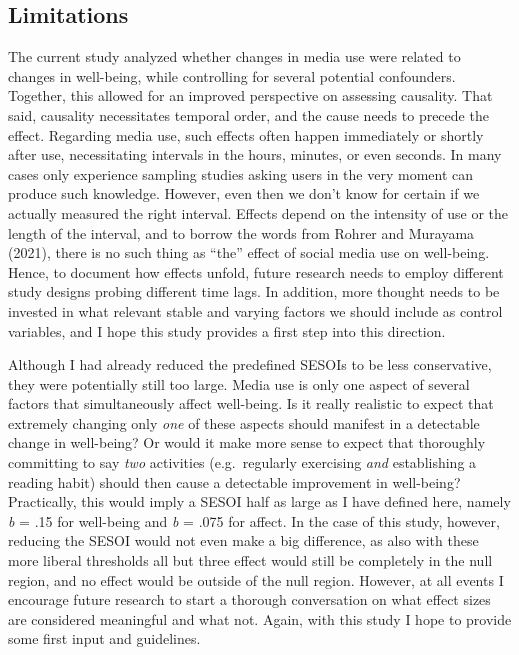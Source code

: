 \documentclass[
  man,mask]{apa6}
\begin{document}
\hypertarget{limitations}{%
\subsection{Limitations}\label{limitations}}

The current study analyzed whether changes in media use were related to changes in well-being, while controlling for several potential confounders.
Together, this allowed for an improved perspective on assessing causality.
That said, causality necessitates temporal order, and the cause needs to precede the effect.
Regarding media use, such effects often happen immediately or shortly after use, necessitating intervals in the hours, minutes, or even seconds.
In many cases only experience sampling studies asking users in the very moment can produce such knowledge.
However, even then we don't know for certain if we actually measured the right interval.
Effects depend on the intensity of use or the length of the interval, and to borrow the words from Rohrer and Murayama (2021), there is no such thing as ``the'' effect of social media use on well-being.
Hence, to document how effects unfold, future research needs to employ different study designs probing different time lags.
In addition, more thought needs to be invested in what relevant stable and varying factors we should include as control variables, and I hope this study provides a first step into this direction.

Although I had already reduced the predefined SESOIs to be less conservative, they were potentially still too large.
Media use is only one aspect of several factors that simultaneously affect well-being.
Is it really realistic to expect that extremely changing only \emph{one} of these aspects should manifest in a detectable change in well-being?
Or would it make more sense to expect that thoroughly committing to say \emph{two} activities (e.g.~regularly exercising \emph{and} establishing a reading habit) should then cause a detectable improvement in well-being?
Practically, this would imply a SESOI half as large as I have defined here, namely \emph{b} = \textbar.15\textbar{} for well-being and \emph{b} = \textbar.075\textbar{} for affect.
In the case of this study, however, reducing the SESOI would not even make a big difference, as also with these more liberal thresholds all but three effect would still be completely in the null region, and no effect would be outside of the null region.
However, at all events I encourage future research to start a thorough conversation on what effect sizes are considered meaningful and what not.
Again, with this study I hope to provide some first input and guidelines.
\end{document}
